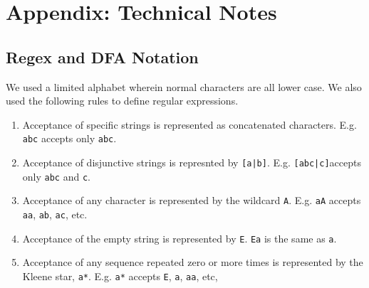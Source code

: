 \documentclass[10pt,letterpaper]{article}
\begin{document}

\setlength{\bibleftmargin}{.125in}
\setlength{\bibindent}{-\bibleftmargin}
 

\section{Appendix: Technical Notes}
\subsection{Regex and DFA Notation}
We used a limited alphabet wherein normal characters are all lower case. We also used the following rules to define regular expressions.
\begin{enumerate}
	\item Acceptance of specific strings is represented as concatenated characters. E.g. \verb!abc! accepts only \verb!abc!.
	\item Acceptance of disjunctive strings is represnted by \verb![a|b]!. E.g. \verb![abc|c]!accepts only \verb!abc! and \verb!c!.
	\item Acceptance of any character is represented by the wildcard \verb!A!. E.g. \verb!aA! accepts \verb!aa!, \verb!ab!, \verb!ac!, etc.
	\item Acceptance of the empty string is represented by \verb!E!. \verb!Ea! is the same as \verb!a!.
	\item Acceptance of any sequence repeated zero or more times is represented by the Kleene star, \verb!a*!. E.g. \verb!a*! accepts \verb!E!, \verb!a!, \verb!aa!, etc, 
\end{enumerate}
\end{document}
